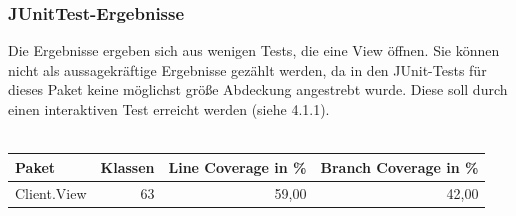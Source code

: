 \documentclass[a4paper]{article}
\begin{document}
\subsubsection{JUnitTest-Ergebnisse}
Die Ergebnisse ergeben sich aus wenigen Tests, die eine View öffnen. Sie können nicht als aussagekräftige Ergebnisse gezählt werden, da in den JUnit-Tests für dieses Paket keine möglichst größe Abdeckung angestrebt wurde. Diese soll durch einen interaktiven Test erreicht werden (siehe 4.1.1).
\ \\ \ \\

\noindent
\begin{tabular}{|l|r|r|r|}
\hline
Paket & Klassen & Line Coverage in \% & Branch Coverage in \% \\ \hline \hline
Client.View & 63 & 59,00 & 42,00 \\ \hline
\end{tabular}
\end{document}
